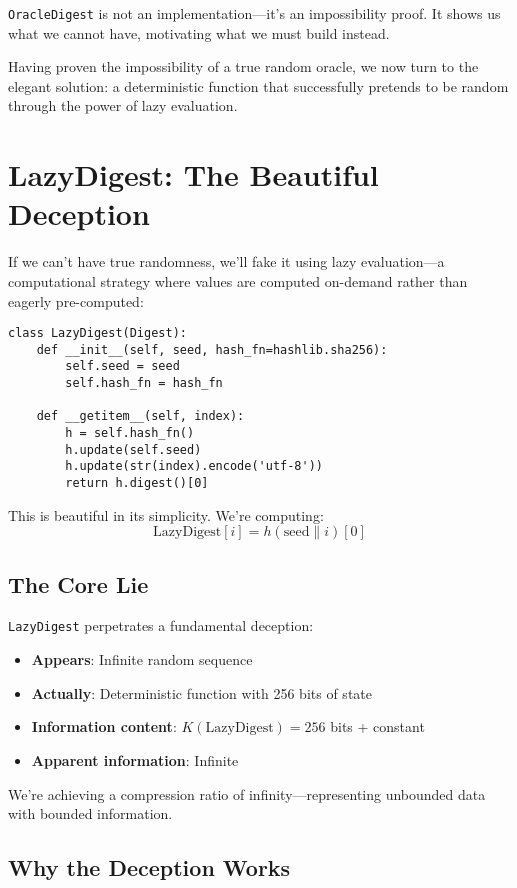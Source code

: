\documentclass[11pt]{article}
\begin{document}
\texttt{OracleDigest} is not an implementation---it's an impossibility proof. It shows us what we cannot have, motivating what we must build instead.

Having proven the impossibility of a true random oracle, we now turn to the elegant solution: a deterministic function that successfully pretends to be random through the power of lazy evaluation.

\section{LazyDigest: The Beautiful Deception}

If we can't have true randomness, we'll fake it using lazy evaluation---a computational strategy where values are computed on-demand rather than eagerly pre-computed:

\begin{lstlisting}
class LazyDigest(Digest):
    def __init__(self, seed, hash_fn=hashlib.sha256):
        self.seed = seed
        self.hash_fn = hash_fn
    
    def __getitem__(self, index):
        h = self.hash_fn()
        h.update(self.seed)
        h.update(str(index).encode('utf-8'))
        return h.digest()[0]
\end{lstlisting}

This is beautiful in its simplicity. We're computing:
$$\text{LazyDigest}[i] = h(\text{seed} \| i)[0]$$

\subsection{The Core Lie}

\texttt{LazyDigest} perpetrates a fundamental deception:
\begin{itemize}
\item \textbf{Appears}: Infinite random sequence
\item \textbf{Actually}: Deterministic function with 256 bits of state
\item \textbf{Information content}: $K(\text{LazyDigest}) = 256$ bits + constant
\item \textbf{Apparent information}: Infinite
\end{itemize}

We're achieving a compression ratio of infinity---representing unbounded data with bounded information.

\subsection{Why the Deception Works}
\end{document}
